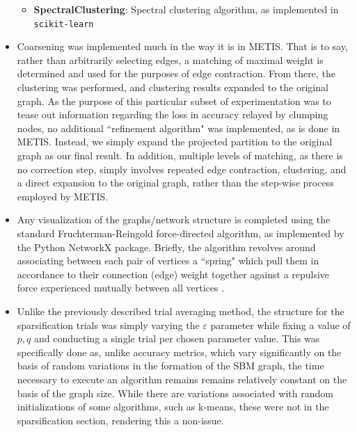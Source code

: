 \documentclass{article}
\begin{document}
\begin{itemize}
\begin{itemize}
        \item \textbf{SpectralClustering}: Spectral clustering algorithm, as implemented in \texttt{scikit-learn}
    \end{itemize}
    \item Coarsening was implemented much in the way it is in METIS. That is to say, rather than arbitrarily selecting edges, a matching of maximal weight is determined and used for the purposes of edge contraction. From there, the clustering was performed, and clustering results expanded to the original graph. As the purpose of this particular subset of experimentation was to tease out information regarding the loss in accuracy relayed by clumping nodes, no additional ``refinement algorithm" was implemented, as is done in METIS. Instead, we simply expand the projected partition to the original graph as our final result. In addition, multiple levels of matching, as there is no correction step, simply involves repeated edge contraction, clustering, and a direct expansion to the original graph, rather than the step-wise process employed by METIS.
    \item Any visualization of the graphs/network structure is completed using the standard Fruchterman-Reingold force-directed algorithm, as implemented by the Python NetworkX package. Briefly, the algorithm revolves around associating between each pair of vertices a ``spring" which pull them in accordance to their connection (edge) weight together against a repulsive force experienced mutually between all vertices \cite{graph-viz}.
    \item Unlike the previously described trial averaging method, the structure for the sparsification trials was simply varying the $\varepsilon$ parameter while fixing a value of $p,q$ and conducting a single trial per chosen parameter value. This was specifically done as, unlike accuracy metrics, which vary significantly on the basis of random variations in the formation of the SBM graph, the time necessary to execute an algorithm remains remains relatively constant on the basis of the graph size. While there are variations associated with random initializations of some algorithms, such as k-means, these were not in the sparsification section, rendering this a non-issue.
\end{itemize}
\end{document}
